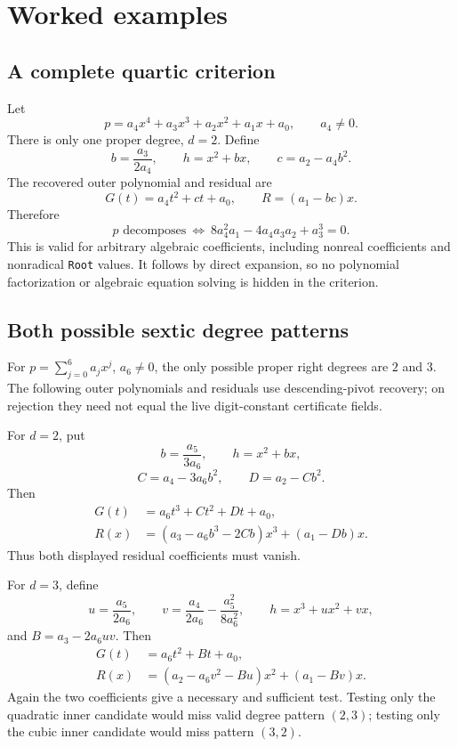 \documentclass[11pt,a4paper]{article}
\numberwithin{equation}{section}
\theoremstyle{definition}
\theoremstyle{remark}
\newcommand{\code}[1]{\texttt{#1}}
\begin{document}
\section{Worked examples}
\label{sec:examples}
\subsection{A complete quartic criterion}
Let
\[
 p=a_4x^4+a_3x^3+a_2x^2+a_1x+a_0,\qquad a_4\ne0.
\]
There is only one proper degree, $d=2$. Define
\[
 b=\frac{a_3}{2a_4},\qquad h=x^2+bx,\qquad
 c=a_2-a_4b^2.
\]
The recovered outer polynomial and residual are
\[
 G(t)=a_4t^2+ct+a_0,\qquad R=(a_1-bc)x.
\]
Therefore
\begin{equation}
 \boxed{p\text{ decomposes}\ \Longleftrightarrow\
 8a_4^2a_1-4a_4a_3a_2+a_3^3=0.}\label{eq:quartic-criterion}
\end{equation}
This is valid for arbitrary algebraic coefficients, including nonreal coefficients and nonradical \code{Root} values. It follows by direct expansion, so no polynomial factorization or algebraic equation solving is hidden in the criterion.

\subsection{Both possible sextic degree patterns}
For $p=\sum_{j=0}^6a_jx^j$, $a_6\ne0$, the only possible proper right degrees are $2$ and $3$. The following outer polynomials and residuals use descending-pivot recovery; on rejection they need not equal the live digit-constant certificate fields.

For $d=2$, put
\[
 b=\frac{a_5}{3a_6},\qquad h=x^2+bx,
\]
\[
 C=a_4-3a_6b^2,\qquad D=a_2-Cb^2.
\]
Then
\begin{align*}
 G(t)&=a_6t^3+Ct^2+Dt+a_0,\\
 R(x)&=(a_3-a_6b^3-2Cb)x^3+(a_1-Db)x.
\end{align*}
Thus both displayed residual coefficients must vanish.

For $d=3$, define
\[
 u=\frac{a_5}{2a_6},\qquad
 v=\frac{a_4}{2a_6}-\frac{a_5^2}{8a_6^2},\qquad h=x^3+ux^2+vx,
\]
and $B=a_3-2a_6uv$. Then
\begin{align*}
 G(t)&=a_6t^2+Bt+a_0,\\
 R(x)&=(a_2-a_6v^2-Bu)x^2+(a_1-Bv)x.
\end{align*}
Again the two coefficients give a necessary and sufficient test. Testing only the quadratic inner candidate would miss valid degree pattern $(2,3)$; testing only the cubic inner candidate would miss pattern $(3,2)$.
\end{document}
